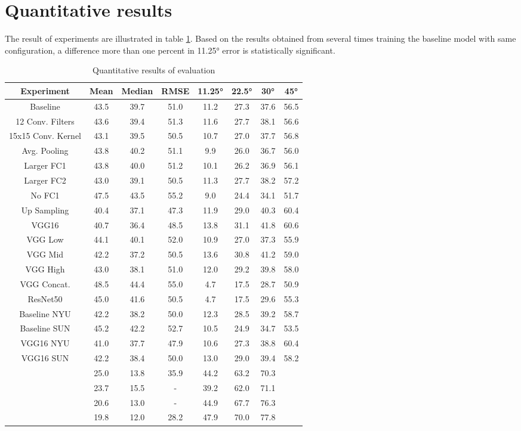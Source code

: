 \section{Quantitative results}

The result of experiments are illustrated in table \ref{tab:results}. Based on the results obtained from several times training the baseline model with same configuration, a difference more than one percent in \ang{11.25} error is statistically significant.  

\begin{table}[h]
\centering
\begin{tabular}{cccccccc}
Experiment & Mean & Median & RMSE & \ang{11.25} & \ang{22.5} & \ang{30} & \ang{45} \\
\hline
\hline
Baseline & 43.5 & 39.7 & 51.0 & 11.2 & 27.3 & 37.6 & 56.5 \\
12 Conv. Filters & 43.6 & 39.4 & 51.3 & 11.6 & 27.7 & 38.1 & 56.6 \\
15x15 Conv. Kernel & 43.1 & 39.5 & 50.5 & 10.7 & 27.0 & 37.7 & 56.8 \\
Avg. Pooling & 43.8 & 40.2 & 51.1 & 9.9 & 26.0 & 36.7 & 56.0 \\
Larger FC1 & 43.8 & 40.0 & 51.2 & 10.1 & 26.2 & 36.9 & 56.1 \\
Larger FC2 & 43.0 & 39.1 & 50.5 & 11.3 & 27.7 & 38.2 & 57.2 \\
No FC1 & 47.5 & 43.5 & 55.2 & 9.0 & 24.4 & 34.1 & 51.7 \\
Up Sampling & 40.4 & 37.1 & 47.3 & 11.9 & 29.0 & 40.3 & 60.4 \\
\hline
VGG16 & 40.7 & 36.4 & 48.5 & 13.8 & 31.1 & 41.8 & 60.6 \\
VGG Low & 44.1 & 40.1 & 52.0 & 10.9 & 27.0 & 37.3 & 55.9 \\
VGG Mid & 42.2 & 37.2 & 50.5 & 13.6 & 30.8 & 41.2 & 59.0 \\
VGG High & 43.0 & 38.1 & 51.0 & 12.0 & 29.2 & 39.8 & 58.0 \\
VGG Concat. & 48.5 & 44.4 & 55.0 & 4.7 & 17.5 & 28.7 & 50.9 \\
\hline
ResNet50 & 45.0 & 41.6 & 50.5 & 4.7 & 17.5 & 29.6 & 55.3 \\
\hline
Baseline NYU & 42.2 & 38.2 & 50.0 & 12.3 & 28.5 & 39.2 & 58.7 \\
Baseline SUN & 45.2 & 42.2 & 52.7 & 10.5 & 24.9 & 34.7 & 53.5 \\
VGG16 NYU & 41.0 & 37.7 & 47.9 & 10.6 & 27.3 & 38.8 & 60.4 \\
VGG16 SUN & 42.2 & 38.4 & 50.0 & 13.0 & 29.0 & 39.4 & 58.2 \\
\hline
\citeauthor*{wang} \cite{wang} & 25.0 & 13.8 & 35.9 & 44.2 & 63.2 & 70.3 \\
\citeauthor*{eigen}\cite{eigen} & 23.7 & 15.5 & - & 39.2 & 62.0 & 71.1 \\
\citeauthor*{dharmasiri}\cite{dharmasiri} & 20.6 & 13.0 & - & 44.9 & 67.7 & 76.3 \\
\citeauthor*{bansal}\cite{bansal} & 19.8 & 12.0 & 28.2 & 47.9 & 70.0 & 77.8 \\
\end{tabular}
\caption{Quantitative results of evaluation}
\label{tab:results}
\end{table}


